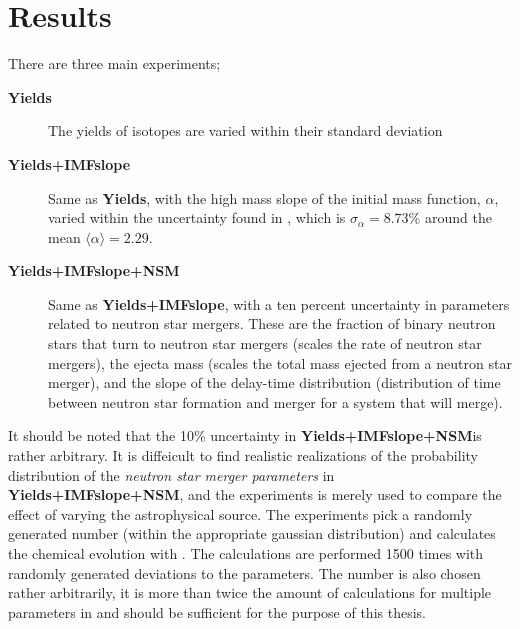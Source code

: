 \chapter{Results}
\label{sec:results}

\newcommand\expone{\textbf{Yields}}
\newcommand\exptwo{\textbf{Yields+IMFslope}}
\newcommand\expthree{\textbf{Yields+IMFslope+NSM}}
There are three main experiments;
\begin{description}
\item[\expone] The yields of isotopes are varied within their standard deviation 
\item[\exptwo] Same as \expone, with the high mass slope of the initial mass function, $\alpha$, varied within the uncertainty found in , which is $\sigma_{\alpha}=8.73\%$ around the mean $\langle \alpha \rangle = 2.29$.
\item[\expthree] Same as \exptwo, with a ten percent uncertainty in parameters related to neutron star mergers. These are the fraction of binary neutron stars that turn to neutron star mergers (scales the rate of neutron star mergers), the ejecta mass (scales the total mass ejected from a neutron star merger), and the slope of the delay-time distribution (distribution of time between neutron star formation and merger for a system that will merge).
\end{description}
It should be noted that the 10\% uncertainty in \expthree is rather arbitrary.
It is diffeicult to find realistic realizations of the probability distribution of the \textit{neutron star merger parameters} in \expthree, and the experiments is merely used to compare the effect of varying the astrophysical source.
The experiments pick a randomly generated number (within the appropriate gaussian distribution) and calculates the chemical evolution with \omegamodel.
The calculations are performed 1500 times with randomly generated deviations to the parameters.
The number is also chosen rather arbitrarily, it is more than twice the amount of calculations for multiple parameters in  and should be sufficient for the purpose of this thesis.

